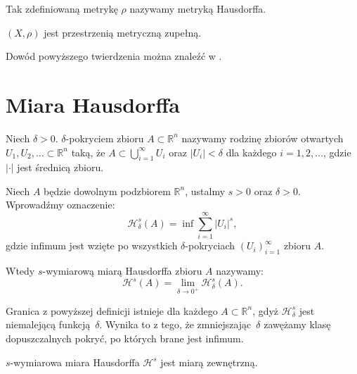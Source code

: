 \documentclass{mini}
\begin{document}
Tak zdefiniowaną metrykę $\rho$ nazywamy metryką Hausdorffa.

\begin{tw}\label{zup}
$(X,\rho)$ jest przestrzenią metryczną zupełną. 
\end{tw}

Dowód powyższego twierdzenia można znaleźć w \cite{HM}.

\section{Miara Hausdorffa}

\begin{df}
Niech $\delta > 0$. $\delta$-pokryciem zbioru $A \subset \mathbb{R}^n$ nazywamy rodzinę zbiorów otwartych $U_1,U_2,\ldots\subset\mathbb{R}^n$ taką, że $A\subset \bigcup_{i=1}^{\infty}U_i$ oraz $|U_i|<\delta$ dla każdego $i=1,2,\ldots$, gdzie $|\cdot|$ jest średnicą zbioru.
\end{df}

\begin{df}
Niech $A$ będzie dowolnym podzbiorem $\mathbb{R}^n$, ustalmy $s>0$ oraz $\delta>0$. Wprowadźmy oznaczenie:
$$
\mathcal{H}^{s}_{\delta}{(A)} = \inf \sum^{\infty}_{i=1}{|U_i|^{s}},
$$
gdzie infimum jest wzięte po wszystkich $\delta$-pokryciach $ (U_i)^{\infty}_{i=1}$ zbioru $A$.

Wtedy $s$-wymiarową miarą Hausdorffa zbioru $A$ nazywamy:
$$
\mathcal{H}^s(A)=\lim_{\delta\rightarrow0^+} \mathcal{H}^s_{\delta}(A).
$$
\end{df}

Granica z powyższej definicji istnieje dla każdego $A \subset \mathbb{R}^n$, gdyż $\mathcal{H}^{s}_{\delta}$ jest niemalejącą funkcją~$\delta$. Wynika to z tego, że zmniejszając~$\delta$ zawężamy klasę dopuszczalnych pokryć, po których brane jest infimum.

\begin{tw}
$s$-wymiarowa miara Hausdorffa $\mathcal{H}^s$ jest miarą zewnętrzną.
\end{tw}
\end{document}

